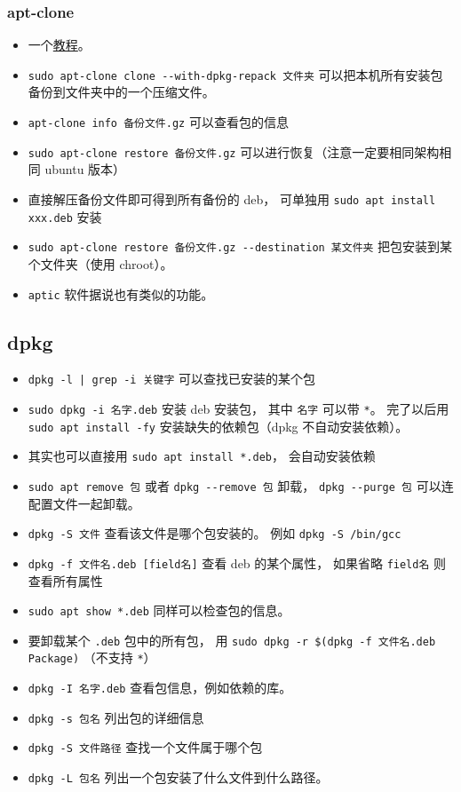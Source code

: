 \subsubsection{apt-clone}
\begin{itemize}
\item 一个\href{https://ubunlog.com/en/apt-clone-copia-seguridad-paquetes/}{教程}。
\item \verb`sudo apt-clone clone --with-dpkg-repack 文件夹` 可以把本机所有安装包备份到文件夹中的一个压缩文件。
\item \verb`apt-clone info 备份文件.gz` 可以查看包的信息
\item \verb`sudo apt-clone restore 备份文件.gz` 可以进行恢复（注意一定要相同架构相同 ubuntu 版本）
\item 直接解压备份文件即可得到所有备份的 deb， 可单独用 \verb`sudo apt install xxx.deb` 安装
\item \verb`sudo apt-clone restore 备份文件.gz --destination 某文件夹` 把包安装到某个文件夹（使用 chroot）。
\item \verb`aptic` 软件据说也有类似的功能。
\end{itemize}



\subsection{dpkg}
\begin{itemize}
\item \verb`dpkg -l | grep -i 关键字` 可以查找已安装的某个包
\item \verb`sudo dpkg -i 名字.deb` 安装 deb 安装包， 其中 \verb`名字` 可以带 \verb`*`。 完了以后用 \verb`sudo apt install -fy` 安装缺失的依赖包（dpkg 不自动安装依赖）。
\item 其实也可以直接用 \verb`sudo apt install *.deb`， 会自动安装依赖
\item \verb`sudo apt remove 包` 或者 \verb`dpkg --remove 包` 卸载， \verb`dpkg --purge 包` 可以连配置文件一起卸载。
\item \verb`dpkg -S 文件` 查看该文件是哪个包安装的。 例如 \verb`dpkg -S /bin/gcc`
\item \verb`dpkg -f 文件名.deb [field名]` 查看 deb 的某个属性， 如果省略 \verb`field名` 则查看所有属性
\item \verb`sudo apt show *.deb` 同样可以检查包的信息。
\item 要卸载某个 \verb`.deb` 包中的所有包， 用 \verb`sudo dpkg -r $(dpkg -f 文件名.deb Package)` （不支持 \verb`*`）
\item \verb`dpkg -I 名字.deb` 查看包信息，例如依赖的库。
\item \verb`dpkg -s 包名` 列出包的详细信息
\item \verb`dpkg -S 文件路径` 查找一个文件属于哪个包
\item \verb`dpkg -L 包名` 列出一个包安装了什么文件到什么路径。
\end{itemize}


